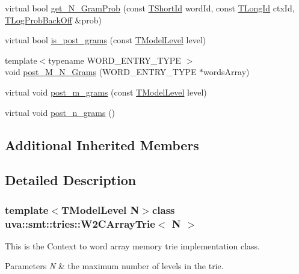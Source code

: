 \begin{DoxyCompactItemize}
\item 
virtual bool \hyperlink{classuva_1_1smt_1_1tries_1_1_w2_c_array_trie_aade11f7758c72f04ffbc30d4fb9b0ceb}{get\+\_\+\+N\+\_\+\+Gram\+Prob} (const \hyperlink{namespaceuva_1_1smt_1_1hashing_adcf22e1982ad09d3a63494c006267469}{T\+Short\+Id} word\+Id, const \hyperlink{namespaceuva_1_1smt_1_1hashing_a5992ac0dea0fb3226fb403ede09fad55}{T\+Long\+Id} ctx\+Id, \hyperlink{namespaceuva_1_1smt_1_1tries_acd0660255dd9ef5d644f01de49102750}{T\+Log\+Prob\+Back\+Off} \&prob)
\item 
virtual bool \hyperlink{classuva_1_1smt_1_1tries_1_1_w2_c_array_trie_a89ce79512b08afab4ece1158eff68fee}{is\+\_\+post\+\_\+grams} (const \hyperlink{namespaceuva_1_1smt_1_1tries_a20577a44b3a42d26524250634379b7cb}{T\+Model\+Level} level)
\item 
{\footnotesize template$<$typename W\+O\+R\+D\+\_\+\+E\+N\+T\+R\+Y\+\_\+\+T\+Y\+P\+E $>$ }\\void \hyperlink{classuva_1_1smt_1_1tries_1_1_w2_c_array_trie_a5b8c92f6b4fd9883cf0d2c83cc1868e2}{post\+\_\+\+M\+\_\+\+N\+\_\+\+Grams} (W\+O\+R\+D\+\_\+\+E\+N\+T\+R\+Y\+\_\+\+T\+Y\+P\+E $\ast$words\+Array)
\item 
virtual void \hyperlink{classuva_1_1smt_1_1tries_1_1_w2_c_array_trie_a0e9d011553a7d2a3651f6c9b48cc0c69}{post\+\_\+m\+\_\+grams} (const \hyperlink{namespaceuva_1_1smt_1_1tries_a20577a44b3a42d26524250634379b7cb}{T\+Model\+Level} level)
\item 
virtual void \hyperlink{classuva_1_1smt_1_1tries_1_1_w2_c_array_trie_aff8942ff3f4b91f4a79710635d2c637c}{post\+\_\+n\+\_\+grams} ()
\end{DoxyCompactItemize}
\subsection*{Additional Inherited Members}


\subsection{Detailed Description}
\subsubsection*{template$<$T\+Model\+Level N$>$class uva\+::smt\+::tries\+::\+W2\+C\+Array\+Trie$<$ N $>$}

This is the Context to word array memory trie implementation class.


\begin{DoxyParams}{Parameters}
{\em N} & the maximum number of levels in the trie. \\
\hline
\end{DoxyParams}


